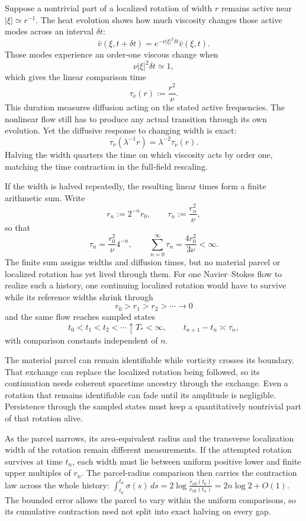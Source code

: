 
Suppose a nontrivial part of a localized rotation of width \(r\) remains active near \(|\xi|\simeq r^{-1}\). The heat evolution shows how much viscosity changes those active modes across an interval \(\delta t\):
\[
  \widehat v(\xi,t+\delta t)
  =
  e^{-\nu|\xi|^2\delta t}\widehat v(\xi,t).
\]
Those modes experience an order-one viscous change when
\[
  \nu|\xi|^2\delta t\simeq1,
\]
which gives the linear comparison time
\[
  \tau_\nu(r)
  :=
  \frac{r^2}{\nu}.
\]
This duration measures diffusion acting on the stated active frequencies. The nonlinear flow still has to produce any actual transition through its own evolution. Yet the diffusive response to changing width is exact:
\[
  \tau_\nu(\lambda^{-1}r)
  =
  \lambda^{-2}\tau_\nu(r).
\]
Halving the width quarters the time on which viscosity acts by order one, matching the time contraction in the full-field rescaling.


If the width is halved repeatedly, the resulting linear times form a finite arithmetic sum. Write
\[
  r_n:=2^{-n}r_0,
  \qquad
  \tau_n:=\frac{r_n^2}{\nu},
\]
so that
\[
  \tau_n
  =
  \frac{r_0^2}{\nu}4^{-n},
  \qquad
  \sum_{n=0}^{\infty}\tau_n
  =
  \frac{4r_0^2}{3\nu}
  <
  \infty.
\]
The finite sum assigns widths and diffusion times, but no material parcel or localized rotation has yet lived through them. For one Navier--Stokes flow to realize such a history, one continuing localized rotation would have to survive while its reference widths shrink through
\[
  r_0>r_1>r_2>\cdots\longrightarrow0
\]
and the same flow reaches sampled states
\[
  t_0<t_1<t_2<\cdots\uparrow T_*<\infty,
  \qquad
  t_{n+1}-t_n\asymp\tau_n,
\]
with comparison constants independent of \(n\).

The material parcel can remain identifiable while vorticity crosses its boundary. That exchange can replace the localized rotation being followed, so its continuation needs coherent spacetime ancestry through the exchange. Even a rotation that remains identifiable can fade until its amplitude is negligible. Persistence through the sampled states must keep a quantitatively nontrivial part of that rotation alive.

As the parcel narrows, its area-equivalent radius and the transverse localization width of the rotation remain different measurements. If the attempted rotation survives at time \(t_n\), each width must lie between uniform positive lower and finite upper multiples of \(r_n\). The parcel-radius comparison then carries the contraction law across the whole history:
\(
  \int_{t_0}^{t_n}\sigma(s)\,ds
  =
  2\log\frac{r_{\mathrm{eff}}(t_0)}{r_{\mathrm{eff}}(t_n)}
  =
  2n\log2+O(1).
\)
The bounded error allows the parcel to vary within the uniform comparisons, so its cumulative contraction need not split into exact halving on every gap.

